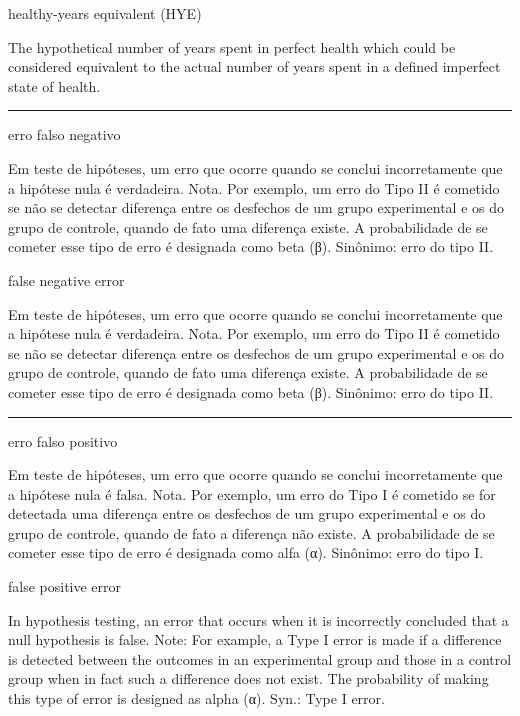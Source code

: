 \documentclass[
]{book}
\begin{document}
healthy-years equivalent (HYE)

The hypothetical number of years spent in perfect health which could be considered equivalent to the actual number of years spent in a defined imperfect state of health.

\begin{center}\rule{0.5\linewidth}{0.5pt}\end{center}

erro falso negativo

Em teste de hipóteses, um erro que ocorre quando se conclui incorretamente que a hipótese nula é verdadeira. Nota. Por exemplo, um erro do Tipo II é cometido se não se detectar diferença entre os desfechos de um grupo experimental e os do grupo de controle, quando de fato uma diferença existe. A probabilidade de se cometer esse tipo de erro é designada como beta (β). Sinônimo: erro do tipo II.

false negative error

Em teste de hipóteses, um erro que ocorre quando se conclui incorretamente que a hipótese nula é verdadeira. Nota. Por exemplo, um erro do Tipo II é cometido se não se detectar diferença entre os desfechos de um grupo experimental e os do grupo de controle, quando de fato uma diferença existe. A probabilidade de se cometer esse tipo de erro é designada como beta (β). Sinônimo: erro do tipo II.

\begin{center}\rule{0.5\linewidth}{0.5pt}\end{center}

erro falso positivo

Em teste de hipóteses, um erro que ocorre quando se conclui incorretamente que a hipótese nula é falsa. Nota. Por exemplo, um erro do Tipo I é cometido se for detectada uma diferença entre os desfechos de um grupo experimental e os do grupo de controle, quando de fato a diferença não existe. A probabilidade de se cometer esse tipo de erro é designada como alfa (α). Sinônimo: erro do tipo I.

false positive error

In hypothesis testing, an error that occurs when it is incorrectly concluded that a null hypothesis is false. Note: For example, a Type I error is made if a difference is detected between the outcomes in an experimental group and those in a control group when in fact such a difference does not exist. The probability of making this type of error is designed as alpha (α). Syn.: Type I error.
\end{document}
